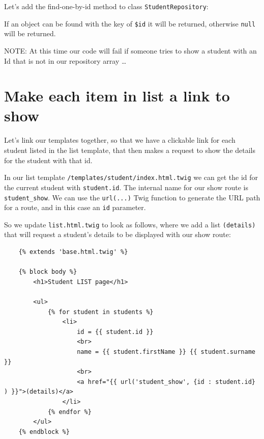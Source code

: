 \documentclass[a4paperpaper,openright]{book}
\newenvironment{Shaded}{}{}
\newcommand{\FunctionTok}[1]{\textcolor[rgb]{0.02,0.16,0.49}{#1}}
\newcommand{\KeywordTok}[1]{\textcolor[rgb]{0.00,0.44,0.13}{\textbf{#1}}}
\newcommand{\NormalTok}[1]{#1}
\newcommand{\OtherTok}[1]{\textcolor[rgb]{0.00,0.44,0.13}{#1}}
\begin{document}
Let's add the find-one-by-id method to class \texttt{StudentRepository}:

\begin{Shaded}
\end{Shaded}

If an object can be found with the key of \texttt{\$id} it will be
returned, otherwise \texttt{null} will be returned.

NOTE: At this time our code will fail if someone tries to show a student
with an Id that is not in our repository array \ldots{}

\hypertarget{make-each-item-in-list-a-link-to-show}{%
\section{Make each item in list a link to
show}\label{make-each-item-in-list-a-link-to-show}}

Let's link our templates together, so that we have a clickable link for
each student listed in the list template, that then makes a request to
show the details for the student with that id.

In our list template \texttt{/templates/student/index.html.twig} we can
get the id for the current student with \texttt{student.id}. The
internal name for our show route is \texttt{student\_show}. We can use
the \texttt{url(...)} Twig function to generate the URL path for a
route, and in this case an \texttt{id} parameter.

So we update \texttt{list.html.twig} to look as follows, where we add a
list \texttt{(details)} that will request a student's details to be
displayed with our show route:

\begin{verbatim}
    {% extends 'base.html.twig' %}

    {% block body %}
        <h1>Student LIST page</h1>

        <ul>
            {% for student in students %}
                <li>
                    id = {{ student.id }}
                    <br>
                    name = {{ student.firstName }} {{ student.surname }}
                    <br>
                    <a href="{{ url('student_show', {id : student.id} ) }}">(details)</a>
                </li>
            {% endfor %}
        </ul>
    {% endblock %}
\end{verbatim}
\end{document}
